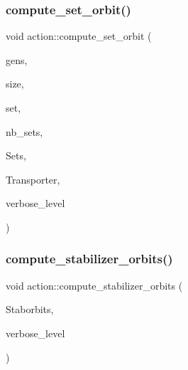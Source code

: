 \mbox{\label{classaction_adc50b0c46c75cff143cfb5dfde56c1c5}} 
\subsubsection{\texorpdfstring{compute\+\_\+set\+\_\+orbit()}{compute\_set\_orbit()}}
{\footnotesize\ttfamily void action\+::compute\+\_\+set\+\_\+orbit (\begin{DoxyParamCaption}\item[{\mbox{\hyperlink{classvector__ge}{vector\+\_\+ge}} \&}]{gens,  }\item[{\mbox{\hyperlink{galois_8h_a09fddde158a3a20bd2dcadb609de11dc}{I\+NT}}}]{size,  }\item[{\mbox{\hyperlink{galois_8h_a09fddde158a3a20bd2dcadb609de11dc}{I\+NT}} $\ast$}]{set,  }\item[{\mbox{\hyperlink{galois_8h_a09fddde158a3a20bd2dcadb609de11dc}{I\+NT}} \&}]{nb\+\_\+sets,  }\item[{\mbox{\hyperlink{galois_8h_a09fddde158a3a20bd2dcadb609de11dc}{I\+NT}} $\ast$$\ast$\&}]{Sets,  }\item[{\mbox{\hyperlink{galois_8h_a09fddde158a3a20bd2dcadb609de11dc}{I\+NT}} $\ast$$\ast$\&}]{Transporter,  }\item[{\mbox{\hyperlink{galois_8h_a09fddde158a3a20bd2dcadb609de11dc}{I\+NT}}}]{verbose\+\_\+level }\end{DoxyParamCaption})}

\mbox{\label{classaction_a460cd7c4b648f59ce370386f4322e972}} 
\subsubsection{\texorpdfstring{compute\+\_\+stabilizer\+\_\+orbits()}{compute\_stabilizer\_orbits()}}
{\footnotesize\ttfamily void action\+::compute\+\_\+stabilizer\+\_\+orbits (\begin{DoxyParamCaption}\item[{\mbox{\hyperlink{classpartitionstack}{partitionstack}} $\ast$\&}]{Staborbits,  }\item[{\mbox{\hyperlink{galois_8h_a09fddde158a3a20bd2dcadb609de11dc}{I\+NT}}}]{verbose\+\_\+level }\end{DoxyParamCaption})}

